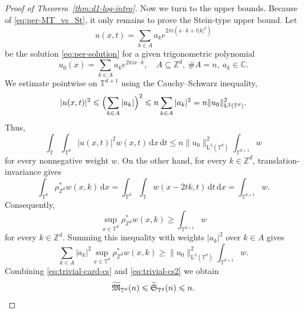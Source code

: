 \documentclass[10pt,a4paper]{amsart}
\numberwithin{equation}{section}
\newcommand{\dd}{\,\mathrm{d}}
\renewcommand{\leq}{\leqslant}
\renewcommand{\geq}{\geqslant}
\begin{document}
\begin{proof}[Proof of Theorem~\ref{thm:d1-log-intro}]
Now we turn to the upper bounds. Because of \eqref{eq:per-MT_vs_St}, it only remains to prove the Stein-type upper bound. 
Let
\[ u(x,t) = \sum_{k\in A} a_k e^{2\pi i (x\cdot k + t|k|^2)} \]
be the solution \eqref{eq:per-solution} for a given trigonometric polynomial
\[ u_0(x) = \sum_{k\in A} a_k e^{2\pi i x\cdot k},\quad A\subseteq\mathbb{Z}^d,\ \#A=n,\ a_k\in\mathbb{C}. \]
We estimate pointwise on $\mathbb{T}^{d+1}$ using the Cauchy--Schwarz inequality,
\[ |u(x,t)|^2 \leq \Bigl(\sum_{k\in A}|a_k|\Bigr)^2
\leq n\sum_{k\in A}|a_k|^2
= n\|u_0\|_{\mathrm{L}^2(\mathbb{T}^d)}^2. \]
Thus,
\begin{equation}\label{eq:trivial-card-cs}
\int_{\mathbb{T}} \int_{\mathbb{T}^d} |u(x,t)|^2w(x,t)\dd x\dd t \leq n\|u_0\|_{\mathrm{L}^2(\mathbb{T}^d)}^2 \int_{\mathbb{T}^{d+1}}w
\end{equation}
for every nonnegative weight $w$. On the other hand, for every $k\in\mathbb{Z}^d$, translation-invariance gives
\[ \int_{\mathbb{T}^d}\rho^{\ast}_{\mathbb{Z}^d}w(x,k)\dd x
= \int_{\mathbb{T}^d}\int_{\mathbb{T}} w(x-2tk,t)\dd t\dd x  
= \int_{\mathbb{T}^{d+1}} w. \]
Consequently,
\[ \sup_{x\in\mathbb{T}^d}\rho^{\ast}_{\mathbb{Z}^d}w(x,k) \geq \int_{\mathbb{T}^{d+1}}w \]
for every $k\in\mathbb{Z}^d$. Summing this inequality with weights $|a_k|^2$ over $k\in A$ gives
\begin{equation}\label{eq:trivial-cs2}
\sum_{k\in A}|a_k|^2 \sup_{x\in\mathbb{T}^d}\rho^{\ast}_{\mathbb{Z}^d}w(x,k)
\geq \|u_0\|_{\mathrm{L}^2(\mathbb{T}^d)}^2 \int_{\mathbb{T}^{d+1}}w.
\end{equation}
Combining \eqref{eq:trivial-card-cs} and \eqref{eq:trivial-cs2} we obtain
\[ \widetilde{\mathfrak{M}}_{\mathbb{T}^d}(n) \leq \widetilde{\mathfrak{S}}_{\mathbb{T}^d}(n) \leq n. \qedhere \]
\end{proof}
\end{document}
